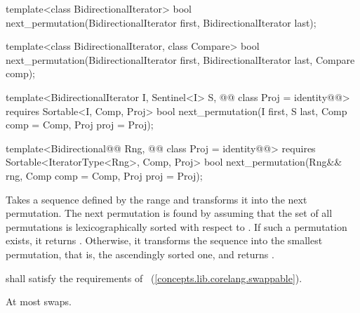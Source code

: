 %
\begin{removedblock}
\begin{itemdecl}
template<class BidirectionalIterator>
  bool next_permutation(BidirectionalIterator first,
                        BidirectionalIterator last);

template<class BidirectionalIterator, class Compare>
  bool next_permutation(BidirectionalIterator first,
                        BidirectionalIterator last, Compare comp);
\end{itemdecl}
\end{removedblock}
\begin{addedblock}
\begin{itemdecl}
template<BidirectionalIterator I, Sentinel<I> S, @@
    class Proj = identity@@>
  requires Sortable<I, Comp, Proj>
  bool next_permutation(I first, S last, Comp comp = Comp{}, Proj proj = Proj{});

template<Bidirectional@@ Rng, @@
    class Proj = identity@@>
  requires Sortable<IteratorType<Rng>, Comp, Proj>
  bool
    next_permutation(Rng&& rng, Comp comp = Comp{}, Proj proj = Proj{});
\end{itemdecl}
\end{addedblock}

\begin{itemdescr}
\pnum
\effects
Takes a sequence defined by the range
and transforms it into the next permutation.
The next permutation is found by assuming that the set of all permutations is
lexicographically sorted with respect to
 .
If such a permutation exists, it returns
.
Otherwise, it transforms the sequence into the smallest permutation,
that is, the ascendingly sorted one, and returns
.

\begin{removedblock}
\pnum
\requires
{} shall satisfy the requirements of
~(\ref{concepts.lib.corelang.swappable}).
\end{removedblock}

\pnum
\complexity
At most
swaps.
\end{itemdescr}

